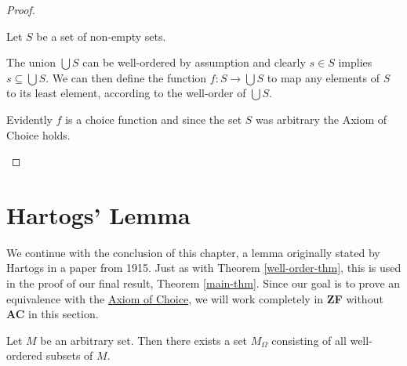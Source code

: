 \documentclass[../../main.tex]{subfiles}
\begin{document}
\begin{proof}
\begin{enumerate}
        Let $S$ be a set of non-empty sets.

        The union $\bigcup S$ can be well-ordered by assumption and clearly $s \in S$ implies $s \subseteq \bigcup S$.
        We can then define the function $f: S \to \bigcup S$ to map any elements of $S$ to its least element, according to the well-order of $\bigcup S$.
        
        Evidently $f$ is a choice function and since the set $S$ was arbitrary the Axiom of Choice holds. \qedhere
    \end{enumerate}
\end{proof}

\section{Hartogs' Lemma}\label{hartogs-lemma-section}
We continue with the conclusion of this chapter, a lemma originally stated by Hartogs in a paper from 1915. %
Just as with Theorem \ref{well-order-thm}, this is used in the proof of our final result, Theorem \ref{main-thm}.
Since our goal is to prove an equivalence with the \hyperref[choice-axiom]{Axiom of Choice}, we will work completely in \textbf{ZF} without \textbf{AC} in this section.

\begin{lemma}\label{well-order-set}\cite[Appendix]{Har15}
    Let $M$ be an arbitrary set.
    Then there exists a set $M_\Omega$ consisting of all well-ordered subsets of $M$. 
\end{lemma}
\end{document}
